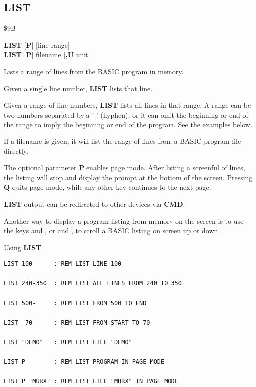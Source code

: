 
\label{BASIC 65 Commands!LIST}
\newpage
\subsection{LIST}
\begin{description}[leftmargin=2cm,style=nextline]
\item [Token:]    \$9B

\item [Format:]   {\bf LIST} [{\bf P}] [line range] \\
                  {\bf LIST} [{\bf P}] filename [{\bf,U} unit]

\item [Usage:]    Lists a range of lines from the BASIC program in memory.
               
                  Given a single line number, {\bf LIST} lists that line.
               
                  Given a range of line numbers, {\bf LIST} lists all lines in that range. A range can be two numbers separated by a '-' (hyphen), or it can omit the beginning or end of the range to imply the beginning or end of the program. See the examples below.
                  
                  If a filename is given, it will list the range of lines from a BASIC program file directly.

\item [Remarks:]  The optional parameter {\bf P} enables page mode. After listing a screenful of lines, the listing will stop and display the prompt \screentext{[MORE]} at the bottom of the screen. Pressing {\bf Q} quits page mode, while any other key continues to the next page.
                
                  {\bf LIST} output can be redirected to other devices via {\bf CMD}.
                
                  Another way to display a program listing from memory on the screen is to use the keys  and , or   and  , to scroll a BASIC listing on screen up or down.

\item [Examples:] Using {\bf LIST}

\begin{tcolorbox}[colback=black,coltext=white]
\verbatimfont{\codefont}
\begin{verbatim}
LIST 100      : REM LIST LINE 100

LIST 240-350  : REM LIST ALL LINES FROM 240 TO 350

LIST 500-     : REM LIST FROM 500 TO END

LIST -70      : REM LIST FROM START TO 70

LIST "DEMO"   : REM LIST FILE "DEMO"

LIST P        : REM LIST PROGRAM IN PAGE MODE

LIST P "MURX" : REM LIST FILE "MURX" IN PAGE MODE
\end{verbatim}
\end{tcolorbox}
\end{description}

